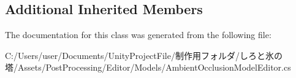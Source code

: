 \subsection*{Additional Inherited Members}


The documentation for this class was generated from the following file\+:\begin{DoxyCompactItemize}
\item 
C\+:/\+Users/user/\+Documents/\+Unity\+Project\+File/制作用フォルダ/しろと氷の塔/\+Assets/\+Post\+Processing/\+Editor/\+Models/Ambient\+Occlusion\+Model\+Editor.\+cs\end{DoxyCompactItemize}
